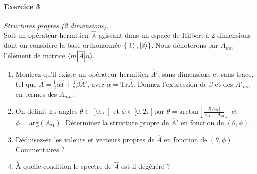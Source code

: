 \paragraph{Exercice 3} \textit{Structures propres (2 dimensions).} \\
Soit un opérateur hermitien $\hat A$ agissant dans un espace de Hilbert à 2 dimensions dont on considère la base orthonormée $\lbrace \ket{1},\ket{2}\rbrace$. Nous dénoterons par $A_{mn}$ l'élément de matrice $\langle m|\hat A|n\rangle$.
\begin{enumerate}
\item Montrez qu'il existe un opérateur hermitien $\hat A'$, sans dimensions et sans trace, tel que $\hat A = \frac{1}{2}\alpha\hat I+\frac{1}{2}\beta\hat A'$, avec $\alpha = \text{Tr}\hat A$. Donnez l'expression de $\beta$ et des $A'_{mn}$ en termes des $A_{mn}$.
\item On définit les angles $\theta\in[0,\pi]$ et $\phi\in[0,2\pi[$ par $\theta = \text{arctan}\left[\frac{2|A_{21}|}{A_{11}-A_{22}}\right]$ et $\phi = \text{arg}(A_{21})$. Déterminez la structure propre de $\hat A'$ en fonction de $(\theta,\phi)$.
\item Déduisez-en les valeurs et vecteurs propres de $\hat A$ en fonction de $(\theta,\phi)$. Commentaires ?
\item À quelle condition le spectre de $\hat A$ est-il dégénéré ?
\end{enumerate}

